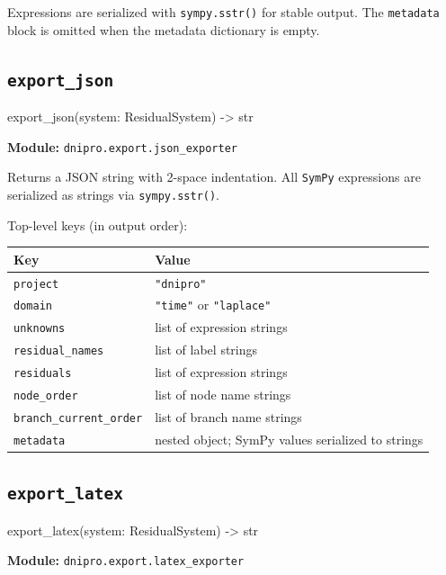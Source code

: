 \documentclass[11pt,a4paper]{article}
\newcommand{\code}[1]{\texttt{#1}}
\newcommand{\sympy}{\texttt{SymPy}}
\newenvironment{apisig}{%
  \begin{trivlist}\item\relax\ttfamily\small
}{%
  \end{trivlist}
}
\begin{document}
Expressions are serialized with \code{sympy.sstr()} for stable output.
The \code{metadata} block is omitted when the metadata dictionary is empty.

\subsection{\texttt{export\_json}}
\label{api:export_json}

\begin{apisig}
export\_json(system: ResidualSystem) -> str
\end{apisig}

\textbf{Module:} \code{dnipro.export.json\_exporter}

Returns a JSON string with 2-space indentation.
All \sympy{} expressions are serialized as strings via \code{sympy.sstr()}.

Top-level keys (in output order):

\begin{longtable}{p{}p{}}
\toprule
Key & Value \\
\midrule
\code{project}              & \code{"dnipro"} \\
\code{domain}               & \code{"time"} or \code{"laplace"} \\
\code{unknowns}             & list of expression strings \\
\code{residual\_names}      & list of label strings \\
\code{residuals}            & list of expression strings \\
\code{node\_order}          & list of node name strings \\
\code{branch\_current\_order} & list of branch name strings \\
\code{metadata}             & nested object; SymPy values serialized to strings \\
\bottomrule
\end{longtable}

\subsection{\texttt{export\_latex}}
\label{api:export_latex}

\begin{apisig}
export\_latex(system: ResidualSystem) -> str
\end{apisig}

\textbf{Module:} \code{dnipro.export.latex\_exporter}
\end{document}
